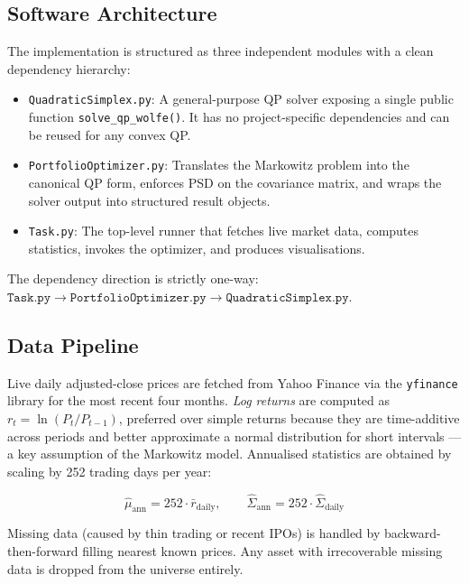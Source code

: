 \documentclass[conference]{IEEEtran}
\begin{document}
\subsection{Software Architecture}

The implementation is structured as three independent modules with a clean
dependency hierarchy:

\begin{itemize}
    \item \texttt{QuadraticSimplex.py}: A general-purpose QP solver exposing
          a single public function \texttt{solve\_qp\_wolfe()}. It has no
          project-specific dependencies and can be reused for any convex QP.
    \item \texttt{PortfolioOptimizer.py}: Translates the Markowitz problem
          into the canonical QP form, enforces PSD on the covariance matrix,
          and wraps the solver output into structured result objects.
    \item \texttt{Task.py}: The top-level runner that fetches live market data,
          computes statistics, invokes the optimizer, and produces
          visualisations.
\end{itemize}

The dependency direction is strictly one-way:
$\texttt{Task.py} \to \texttt{PortfolioOptimizer.py} \to \texttt{QuadraticSimplex.py}$.

\subsection{Data Pipeline}

Live daily adjusted-close prices are fetched from Yahoo Finance via the
\texttt{yfinance} library for the most recent four months.
\textit{Log returns} are computed as $r_t = \ln(P_t / P_{t-1})$, preferred
over simple returns because they are time-additive across periods and better
approximate a normal distribution for short intervals --- a key assumption of
the Markowitz model. Annualised statistics are obtained by scaling by 252
trading days per year:

\begin{equation}
    \hat{\mu}_{\text{ann}} = 252 \cdot \bar{r}_{\text{daily}},
    \qquad
    \hat{\Sigma}_{\text{ann}} = 252 \cdot \hat{\Sigma}_{\text{daily}}
    \label{eq:annualise}
\end{equation}

Missing data (caused by thin trading or recent IPOs) is handled by
backward-then-forward filling nearest known prices. Any asset with
irrecoverable missing data is dropped from the universe entirely.
\end{document}
